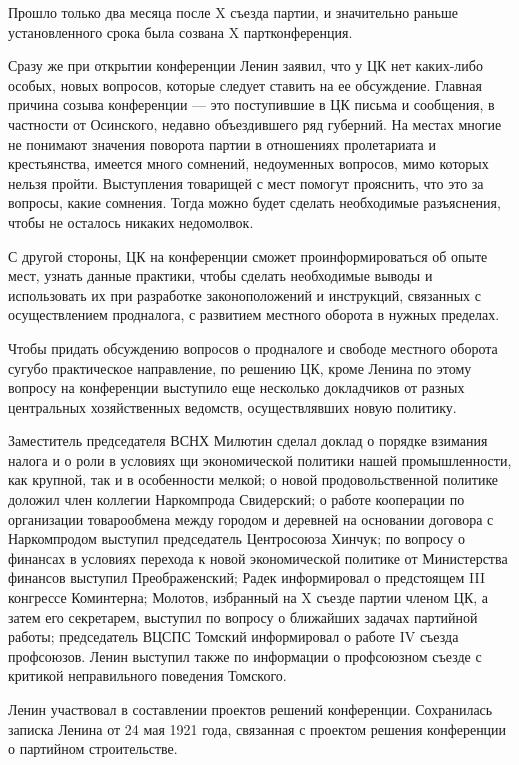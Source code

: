 \documentclass[12pt, a4paper, openany]{book}
\begin{document}
Прошло только два месяца после X съезда партии, и значительно раньше установленного срока была созвана X партконференция.

Сразу же при открытии конференции Ленин заявил, что у ЦК нет каких-либо особых, новых вопросов, которые следует ставить на ее обсуждение. Главная причина созыва конференции — это поступившие в ЦК письма и сообщения, в частности от Осинского, недавно объездившего ряд губерний. На местах многие не понимают значения поворота партии в отношениях пролетариата и крестьянства, имеется много сомнений, недоуменных вопросов, мимо которых нельзя пройти. Выступления товарищей с мест помогут прояснить, что это за вопросы, какие сомнения. Тогда можно будет сделать необходимые разъяснения, чтобы не осталось никаких недомолвок.

С другой стороны, ЦК на конференции сможет проинформироваться об опыте мест, узнать данные практики, чтобы сделать необходимые выводы и использовать их при разработке законоположений и инструкций, связанных с осуществлением продналога, с развитием местного оборота в нужных пределах.

Чтобы придать обсуждению вопросов о продналоге и свободе местного оборота сугубо практическое направление, по решению ЦК, кроме Ленина по этому вопросу на конференции выступило еще несколько докладчиков от разных центральных хозяйственных ведомств, осуществлявших новую политику.

Заместитель председателя ВСНХ Милютин сделал доклад о порядке взимания налога и о роли в условиях щи экономической политики нашей промышленности, как крупной, так и в особенности мелкой; о новой продовольственной политике доложил член коллегии Наркомпрода Свидерский; о работе кооперации по организации товарообмена между городом и деревней на основании договора с Наркомпродом выступил председатель Центросоюза Хинчук; по вопросу о финансах в условиях перехода к новой экономической политике от Министерства финансов выступил Преображенский; Радек информировал о предстоящем III конгрессе Коминтерна; Молотов, избранный на X съезде партии членом ЦК, а затем его секретарем, выступил по вопросу о ближайших задачах партийной работы; председатель ВЦСПС Томский информировал о работе IV съезда профсоюзов. Ленин выступил также по информации о профсоюзном съезде с критикой неправильного поведения Томского.

Ленин участвовал в составлении проектов решений конференции. Сохранилась записка Ленина от 24 мая 1921 года, связанная с проектом решения конференции о партийном строительстве.
\end{document}
